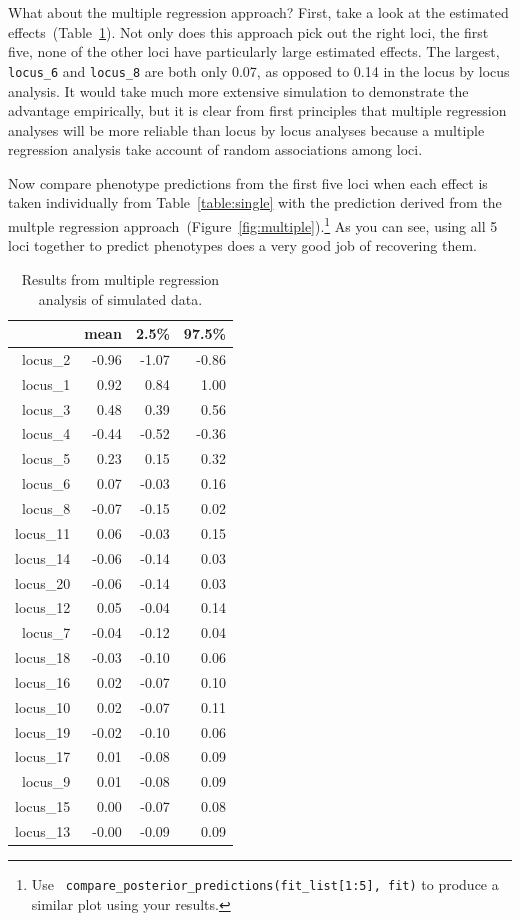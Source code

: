 What about the multiple regression approach? First, take a look at the
estimated effects~(Table~\ref{table:multiple}). Not only does this
approach pick out the right loci, the first five, none of the other
loci have particularly large estimated effects. The largest, {\tt
  locus\_6} and {\tt locus\_8} are both only 0.07, as opposed to 0.14
in the locus by locus analysis. It would take much more extensive
simulation to demonstrate the advantage empirically, but it is clear
from first principles that multiple regression analyses will be more
reliable than locus by locus analyses because a multiple regression
analysis take account of random associations among loci.

Now compare phenotype predictions from the first five loci when each
effect is taken individually from Table~\ref{table:single} with the
prediction derived from the multple regression
approach~(Figure~\ref{fig:multiple}).\footnote{Use {\tt
    compare\_posterior\_predictions(fit\_list[1:5], fit)} to produce a
  similar plot using your results.} As you can see, using all 5 loci
together to predict phenotypes does a very good job of recovering
them. 

\begin{table}[ht]
\centering
\begin{tabular}{rrrr}
  \hline
 & mean & 2.5\% & 97.5\% \\ 
  \hline
locus\_2 & -0.96 & -1.07 & -0.86 \\ 
  locus\_1 & 0.92 & 0.84 & 1.00 \\ 
  locus\_3 & 0.48 & 0.39 & 0.56 \\ 
  locus\_4 & -0.44 & -0.52 & -0.36 \\ 
  locus\_5 & 0.23 & 0.15 & 0.32 \\ 
  locus\_6 & 0.07 & -0.03 & 0.16 \\ 
  locus\_8 & -0.07 & -0.15 & 0.02 \\ 
  locus\_11 & 0.06 & -0.03 & 0.15 \\ 
  locus\_14 & -0.06 & -0.14 & 0.03 \\ 
  locus\_20 & -0.06 & -0.14 & 0.03 \\ 
  locus\_12 & 0.05 & -0.04 & 0.14 \\ 
  locus\_7 & -0.04 & -0.12 & 0.04 \\ 
  locus\_18 & -0.03 & -0.10 & 0.06 \\ 
  locus\_16 & 0.02 & -0.07 & 0.10 \\ 
  locus\_10 & 0.02 & -0.07 & 0.11 \\ 
  locus\_19 & -0.02 & -0.10 & 0.06 \\ 
  locus\_17 & 0.01 & -0.08 & 0.09 \\ 
  locus\_9 & 0.01 & -0.08 & 0.09 \\ 
  locus\_15 & 0.00 & -0.07 & 0.08 \\ 
  locus\_13 & -0.00 & -0.09 & 0.09 \\ 
   \hline
\end{tabular}
\caption{Results from multiple regression analysis of simulated
  data.}\label{table:multiple} 
\end{table}

